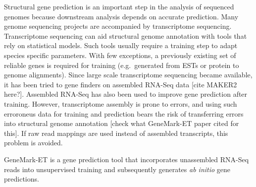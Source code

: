 \documentclass{bioinfo}
\begin{document}
Structural gene prediction is an important step in the analysis of sequenced genomes because downstream analysis depends on accurate prediction. Many genome sequencing projects are accompanied by transcriptome sequencing. Transcriptome sequencing can aid structural genome annotation with tools that rely on statistical models. Such tools usually require a training step to adapt species specific parameters. With few exceptions, a previously existing set of reliable genes is required for training (e.g.~generated from ESTs or protein to genome alignments). Since large scale transcriptome sequencing became available, it has been tried to gene finders on assembled RNA-Seq data [cite MAKER2 here?]. Assembled RNA-Seq has also been used to improve gene prediction after training. However, transcriptome assembly is prone to errors, and using such erroroneus data for training and prediction bears the risk of transferring errors into structural genome annotation [check what GeneMark-ET paper cited for this]. If raw read mappings are used instead of assembled transcripts, this problem is avoided.

GeneMark-ET is a gene prediction tool that incorporates unassembled RNA-Seq reads into unsupervised training and subsequently generates \textit{ab initio} gene predictions. 
\end{document}
